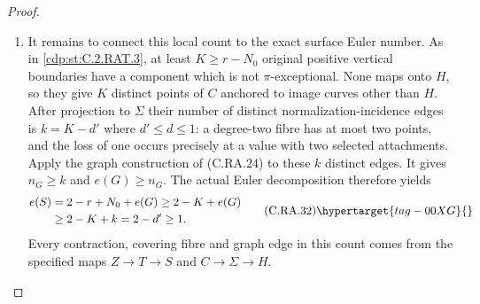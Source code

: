 \begin{proof}
\begin{enumerate}[label={$\langle1\rangle$\arabic*.},leftmargin=*]
\item It remains to connect this local count to the exact
surface Euler number. As in \ref{cdp:st:C.2.RAT.3}, at least
$K\ge r-N_0$ original positive vertical boundaries
have a component which is not $\pi$-exceptional.
None maps onto $H$, so they give $K$ distinct points
of $C$ anchored to image curves other than $H$.
After projection to $\Sigma$ their number of distinct
normalization-incidence edges is $k=K-d'$ where
$d'\le d\le1$: a degree-two fibre has at most two
points, and the loss of one occurs precisely at a
value with two selected attachments. Apply the graph
construction of (C.RA.24) to these $k$ distinct
edges. It gives $n_G\ge k$ and $e(G)\ge n_G$.
The actual Euler decomposition therefore yields
\[
\begin{split}
 e(S)&=2-r+N_0+e(G)
       \ge2-K+e(G)\\
     &\ge2-K+k=2-d'\ge1.
\end{split}
\tag{C.RA.32}\hypertarget{tag-00XG}{}\label{cdp:eq:C.RA.32}
\]
Every contraction, covering fibre and graph edge in
this count comes from the specified maps
$Z\to T\to S$ and $C\to\Sigma\to H$.

\end{enumerate}
\end{proof}
